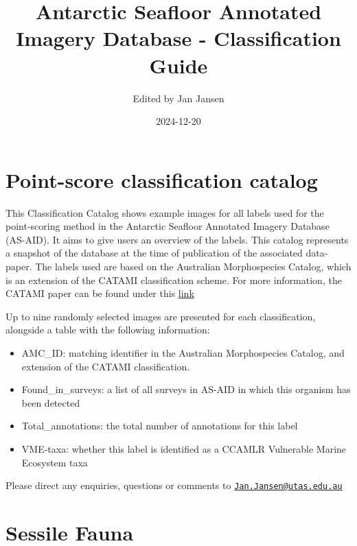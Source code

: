 \documentclass[
]{book}
\title{Antarctic Seafloor Annotated Imagery Database - Classification Guide}
\author{Edited by Jan Jansen}
\date{2024-12-20}
\providecommand{\tightlist}{%
  \setlength{\itemsep}{0pt}\setlength{\parskip}{0pt}}
\begin{document}
\maketitle

{
\setcounter{tocdepth}{1}
\tableofcontents
}
\hypertarget{point-score-classification-catalog}{%
\chapter*{Point-score classification catalog}\label{point-score-classification-catalog}}

This Classification Catalog shows example images for all labels used for the point-scoring method in the Antarctic Seafloor Annotated Imagery Database (AS-AID). It aims to give users an overview of the labels. This catalog represents a snapshot of the database at the time of publication of the associated data-paper.
The labels used are based on the Australian Morphospecies Catalog, which is an extension of the CATAMI classification scheme. For more information, the CATAMI paper can be found under this \href{https://journals.plos.org/plosone/article?id=10.1371/journal.pone.0141039}{link}

Up to nine randomly selected images are presented for each classification, alongside a table with the following information:

\begin{itemize}
\tightlist
\item
  AMC\_ID: matching identifier in the Australian Morphospecies Catalog, and extension of the CATAMI classification.\\
\item
  Found\_in\_surveys: a list of all surveys in AS-AID in which this organism has been detected\\
\item
  Total\_annotations: the total number of annotations for this label\\
\item
  VME-taxa: whether this label is identified as a CCAMLR Vulnerable Marine Ecosystem taxa
\end{itemize}

Please direct any enquiries, questions or comments to \href{mailto:Jan.Jansen@utas.edu.au}{\nolinkurl{Jan.Jansen@utas.edu.au}}

\newpage

\hypertarget{sessile-fauna}{%
\chapter{Sessile Fauna}\label{sessile-fauna}}
\end{document}

